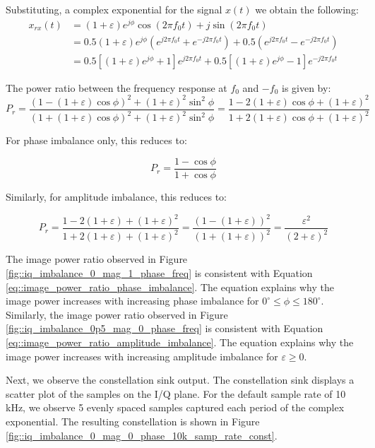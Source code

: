 \documentclass{article}
\begin{document}
Substituting, a complex exponential for the signal $x(t)$ we obtain the following:
\begin{align}
	x_{rx}(t) &= (1+\varepsilon)e^{j\phi}\cos(2{\pi}f_0t) + j\sin(2{\pi}f_0t) \\
	&= 0.5(1+\varepsilon)e^{j\phi}(e^{j2{\pi}f_0t} + e^{-j2{\pi}f_0t}) + 0.5(e^{j2{\pi}f_0t} - e^{-j2{\pi}f_0t})\\
	&= 0.5[(1+\varepsilon)e^{j\phi} + 1]e^{j2{\pi}f_0t} + 0.5[(1+\varepsilon)e^{j\phi} - 1]e^{-j2{\pi}f_0t} \label{eq::rx_signal_iq_imbalance}
\end{align}

The power ratio between the frequency response at $f_0$ and $-f_0$ is given by: 
\begin{equation}
	P_r = \frac{(1-(1+\varepsilon)\cos\phi)^2 + (1+\varepsilon)^2\sin^2\phi}{(1+(1+\varepsilon)\cos\phi)^2 + (1+\varepsilon)^2\sin^2\phi} = \frac{1-2(1+\varepsilon)\cos\phi+(1+\varepsilon)^2}{1+2(1+\varepsilon)\cos\phi+(1+\varepsilon)^2}
\end{equation}

For phase imbalance only, this reduces to:

\begin{equation}
	P_r = \frac{1-\cos\phi}{1+\cos\phi} \label{eq::image_power_ratio_phase_imbalance}
\end{equation}

Similarly, for amplitude imbalance, this reduces to:

\begin{equation}
	P_r = \frac{1-2(1+\varepsilon)+(1+\varepsilon)^2}{1+2(1+\varepsilon)+(1+\varepsilon)^2} = \frac{(1-(1+\varepsilon))^2}{(1+(1+\varepsilon))^2} = \frac{\varepsilon^2}{(2+\varepsilon)^2} \label{eq::image_power_ratio_amplitude_imbalance}
\end{equation}

The image power ratio observed in Figure \ref{fig::iq_imbalance_0_mag_1_phase_freq} is consistent with Equation \ref{eq::image_power_ratio_phase_imbalance}. The equation explains why the image power increases with increasing phase imbalance for $0^{\circ} \leq \phi \leq 180^{\circ}$. Similarly, the image power ratio observed in Figure \ref{fig::iq_imbalance_0p5_mag_0_phase_freq} is consistent with Equation \ref{eq::image_power_ratio_amplitude_imbalance}. The equation explains why the image power increases with increasing amplitude imbalance for $\varepsilon \geq 0$.

Next, we observe the constellation sink output. The constellation sink displays a scatter plot of the samples on the I/Q plane. For the default sample rate of 10 kHz, we observe 5 evenly spaced samples captured each period of the complex exponential. The resulting constellation is shown in Figure \ref{fig::iq_imbalance_0_mag_0_phase_10k_samp_rate_const}.
 
\end{document}
